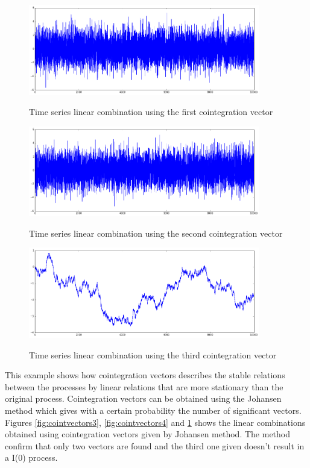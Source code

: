 \begin{figure}[!h]
  \centering
 \begin{minipage}{\textwidth} %
  \centering
  \includegraphics[width=0.9\textwidth]{img/coint-example2} 
   \caption{Time series linear combination using the first cointegration vector }
    \label{fig:cointvectors3}
   \includegraphics[width=0.9\textwidth]{img/coint-example3} 
    \caption{Time series linear combination using the second cointegration vector}
     \label{fig:cointvectors4}
    \includegraphics[width=0.9\textwidth]{img/coint-example4}
 \caption{Time series linear combination using the third cointegration vector}
   \label{fig:cointvectors5}
\end{minipage}
\end{figure}


This example shows how cointegration vectors describes the stable relations
between the processes by linear relations that are more stationary than the
original process. Cointegration vectors can be obtained using the Johansen method which gives with a certain probability the number of significant vectors. Figures    
\ref{fig:cointvectors3}, \ref{fig:cointvectors4}  and \ref{fig:cointvectors5}  shows the linear combinations obtained using cointegration vectors given by Johansen method. The method confirm that only two vectors are found and the third one given doesn't result in a I(0) process.

